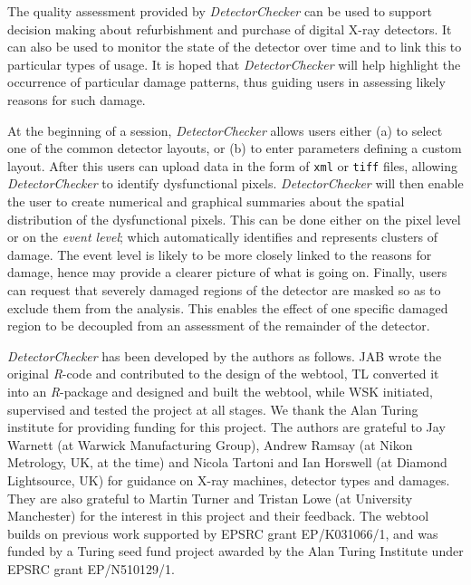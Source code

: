 \documentclass[11pt,a4paper,twosided]{article}
\newcommand{\DetectorChecker}{\emph{DetectorChecker}\xspace}
\newcommand{\Rsoftware}{\emph{R}\xspace}
\begin{document}
The quality assessment provided by \DetectorChecker can be used to support decision making 
about refurbishment and purchase of digital X-ray detectors. 
It can also be used to monitor the state of the detector over time and to 
link this to particular types of usage.
It is hoped that \DetectorChecker will help highlight the occurrence of particular damage patterns,
thus guiding
users in assessing likely reasons for such damage.

At the beginning of a session, 
\DetectorChecker allows users either (a) to select one of the common detector layouts,
or (b) to enter parameters defining a custom layout. 
After this users can upload data in the form of \texttt{xml} or \texttt{tiff} files, allowing \DetectorChecker to identify dysfunctional pixels.
\DetectorChecker will then enable the user to create numerical and graphical summaries 
about the spatial distribution of the dysfunctional pixels. 
This can be done either on the pixel level or on the \emph{event level}; 
which automatically identifies and represents clusters of damage. The event level is likely to be more
closely linked to the reasons for damage, hence may provide a clearer picture 
of what is going on.
Finally, users can request that severely damaged regions of the detector are masked so as 
to exclude them from
the analysis. This enables the effect of one specific damaged region 
to be decoupled from
an assessment of the remainder of the detector.

\DetectorChecker has been developed by the authors as follows.
JAB wrote the original \Rsoftware-code and contributed to the design of the webtool, 
TL converted it into an \Rsoftware-package and designed and built the webtool, 
while WSK initiated, supervised and tested the project at all stages.
We thank the Alan Turing institute for providing funding for this project.
The authors are grateful to Jay Warnett (at Warwick Manufacturing Group), Andrew Ramsay (at Nikon Metrology, UK, at the time) and Nicola Tartoni and Ian Horswell (at Diamond Lightsource, UK) for guidance on X-ray machines, detector types and damages. They are also grateful to Martin Turner and 
Tristan Lowe (at University Manchester) for the interest in this project and their feedback.
The webtool builds on previous work supported by EPSRC grant EP/K031066/1,
and was funded by a Turing seed fund project awarded by the Alan Turing Institute under EPSRC grant EP/N510129/1.



\end{document}

